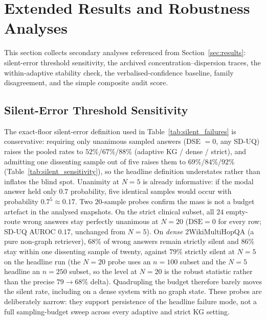 \section{Extended Results and Robustness Analyses}
\label{sec:appendix_extended}

This section collects secondary analyses referenced from
Section~\ref{sec:results}: silent-error threshold sensitivity, the archived
concentration--dispersion traces, the within-adaptive stability check, the
verbalised-confidence baseline, family disagreement, and the simple composite
audit score.

\subsection{Silent-Error Threshold Sensitivity}
\label{sec:appendix_silent_sensitivity}

The exact-floor silent-error definition used in
Table~\ref{tab:silent_failures} is conservative: requiring only unanimous
sampled answers (DSE $=0$, any SD-UQ) raises the pooled rates to
$52\%$/$67\%$/$88\%$ (adaptive KG / dense / strict), and admitting one
dissenting sample out of five raises them to $69\%$/$84\%$/$92\%$
(Table~\ref{tab:silent_sensitivity}), so the headline definition understates
rather than inflates the blind spot.
Unanimity at $N=5$ is already informative: if the modal answer held only
$0.7$ probability, five identical samples would occur with probability
$0.7^5 \approx 0.17$.
Two $20$-sample probes confirm the mass is not a budget artefact in the
analysed snapshots.
On the strict clinical subset, all $24$ empty-route wrong answers stay
perfectly unanimous at $N{=}20$ ($\mathrm{DSE}=0$ for every row; SD-UQ AUROC
$0.17$, unchanged from $N{=}5$).
On \emph{dense} 2WikiMultiHopQA (a pure non-graph retriever), $68\%$ of wrong
answers remain strictly silent and $86\%$ stay within one dissenting sample of
twenty, against $79\%$ strictly silent at $N{=}5$ on the headline run (the
$N{=}20$ probe uses an $n{=}100$ subset and the $N{=}5$ headline an $n{=}250$
subset, so the level at $N{=}20$ is the robust statistic rather than the
precise $79\!\to\!68\%$ delta).
Quadrupling the budget therefore barely moves the silent rate, including on
a dense system with no graph state.
These probes are deliberately narrow: they support persistence of the headline
failure mode, not a full sampling-budget sweep across every adaptive and strict
KG setting.

